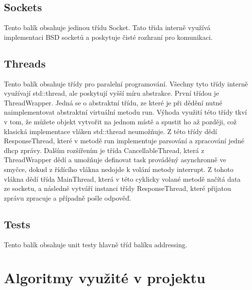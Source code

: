 \documentclass[12pt,a4paper]{report}
\begin{document}
\section*{Sockets}
Tento balík obsahuje jedinou třídu Socket. Tato třida interně využívá implementaci BSD socketů a poskytuje čisté rozhraní pro komunikaci. 
\section*{Threads}
Tento balík obsahuje třídy pro paralelní programování. Všechny tyto třídy interně využívají std::thread, ale poskytují vyšší míru abstrakce. První třídou je ThreadWrapper. Jedná se o abstraktní třídu, ze které je při dědění nutné naimplementovat abstraktní virtuální metodu run. Výhoda využití této třídy tkví v tom, že můžete objekt vytvořit na jednom místě a spustit ho až později, což klasická implementace vláken std::thread neumožňuje. Z této třídy dědí ResponseThread, které v metodě run implementuje parsování a zpracování jedné dhcp zprávy. Dalším rozšířením je třída CancellableThread, která z ThreadWrapper dědí a umožňuje definovat task prováděný asynchronně ve smyčce, dokud z řídícího vlákna nedojde k volání metody interrupt. Z tohoto vlákna dědí třída MainThread, která v této cyklicky volané metodě načítá data ze socketu,  a následně vytváří instanci třídy ResponseThread, které přijatou zprávu zpracuje a případně pošle odpověď.
\section*{Tests}
Tento balík obsahuje unit testy hlavně tříd balíku  addressing.
\chapter{Algoritmy využité v projektu}
\end{document}
